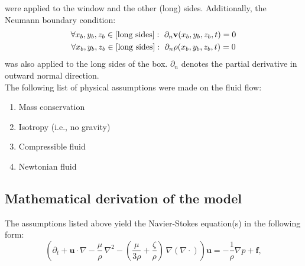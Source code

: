 were applied to the window and the other (long) sides. Additionally, the Neumann boundary condition:
\begin{gather}
    \forall x_b,y_b,z_b \in [\text{long sides}]:~\partial_n \mathbf{v}(x_b,y_b,z_b, t) = 0 \\
    \forall x_b,y_b,z_b \in [\text{long sides}]:~\partial_n \rho(x_b,y_b,z_b, t) = 0
\end{gather}
was also applied to the long sides of the box. $\partial_n$ denotes the partial derivative in outward normal direction. \\


The following list of physical assumptions were made on the fluid flow:
\begin{multicols}{2}
\begin{enumerate}
    \item Mass conservation
    \item Isotropy (i.e., no gravity)
    \item Compressible fluid
    \item Newtonian fluid
\end{enumerate}
\end{multicols}

\subsection{Mathematical derivation of the model}
The assumptions listed above yield the Navier-Stokes equation(s) \cite{batchelor2000introduction} in the following form:
\begin{equation}
{\left(\partial_t +\mathbf {u} \cdot \nabla -\frac{\mu}{\rho} \,\nabla ^{2}-\left(\frac{\mu}{3\rho} +\frac{\zeta}{\rho} \right)\,\nabla (\nabla \cdot )\right)\mathbf {u} =-{\frac {1}{\rho }}\nabla p+\mathbf {f} ,}
\end{equation}

